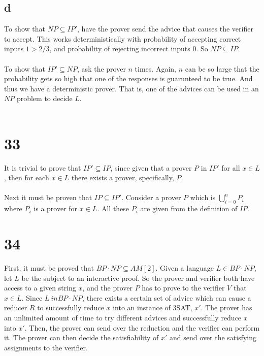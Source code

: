 \documentclass[letterpaper,notitlepage,twoside]{article}
\begin{document}
\subsection{d}
To show that $NP \subseteq IP'$, have the prover send the advice that causes the verifier to accept. This works deterministically with probability of accepting correct inputs $1 > 2/3$, and probability of rejecting incorrect inputs $0$. So $NP \subseteq IP$. \\\\

To show that $IP' \subseteq NP$, ask the prover $n$ times. Again, $n$ can be so large that the probability gets so high that one of the responses is guarunteed to be true. And thus we have a deterministic prover. That is, one of the advices can be used in an $NP$ problem to decide $L$. \\\\

\section*{33}
It is trivial to prove that $IP' \subseteq IP$, since given that a prover $P$ in $IP'$ for all $x \in L$, then for each $x \in L$ there exists a prover, specifically, $P$. \\\\

Next it must be proven that $IP \subseteq IP'$. Consider a prover $P$ which is $\bigcup_{i = 0}^n P_i$ where $P_i$ is a prover for $x \in L$. All these $P_i$ are given from the definition of $IP$. 

\section*{34}
First, it must be proved that $BP \cdot NP \subseteq AM\left[2\right]$. Given a language $L \in BP \cdot NP$, let $L$ be the subject to an interactive proof. So the prover and verifier both have access to a given string $x$, and the prover $P$ has to prove to the verifier $V$ that $x \in L$. Since $L \ in BP \cdot NP$, there exists a certain set of advice which can cause a reducer $R$ to successfully reduce $x$ into an instance of 3SAT, $x'$. The prover has an unlimited amount of time to try different advices and successfully reduce $x$ into $x'$. Then, the prover can send over the reduction and the verifier can perform it. The prover can then decide the satisfiability of $x'$ and send over the satisfying assignments to the verifier.
\end{document}
